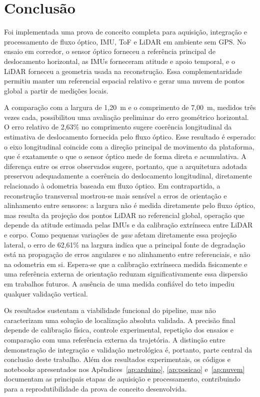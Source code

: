 \section{Conclusão}
\label{sec:conclusao}

Foi implementada uma prova de conceito completa para aquisição, integração e
processamento de fluxo óptico, IMU, ToF e LiDAR em ambiente sem GPS. No ensaio
em corredor, o sensor óptico forneceu a referência principal de deslocamento
horizontal, as IMUs forneceram atitude e apoio temporal, e o LiDAR forneceu a
geometria usada na reconstrução. Essa complementaridade permitiu manter um
referencial espacial relativo e gerar uma nuvem de pontos global a partir de
medições locais.

A comparação com a largura de 1,20~m e o comprimento de 7,00~m, medidos três
vezes cada, possibilitou uma avaliação preliminar do erro geométrico horizontal.
O erro relativo de 2,63\% no comprimento sugere coerência longitudinal da
estimativa de deslocamento fornecida pelo fluxo óptico. Esse resultado é
esperado: o eixo longitudinal coincide com a direção principal de movimento da
plataforma, que é exatamente o que o sensor óptico mede de forma direta e
acumulativa. A diferença entre os erros observados sugere, portanto, que a
arquitetura adotada preservou adequadamente a coerência do deslocamento
longitudinal, diretamente relacionado à odometria baseada em fluxo óptico.
Em contrapartida, a reconstrução transversal mostrou-se mais sensível a erros
de orientação e alinhamento entre sensores: a largura não é medida diretamente
pelo fluxo óptico, mas resulta da projeção dos pontos LiDAR no referencial
global, operação que depende da atitude estimada pelas IMUs e da calibração
extrínseca entre LiDAR e corpo. Como pequenas variações de \textit{yaw}
afetam diretamente essa projeção lateral, o erro de 62,61\% na largura indica
que a principal fonte de degradação está na propagação de erros angulares e no
alinhamento entre referenciais, e não na odometria em si. Espera-se que a
calibração extrínseca medida fisicamente e uma referência externa de orientação
reduzam significativamente essa dispersão em trabalhos futuros. A ausência de
uma medida confiável do teto impediu qualquer validação vertical.

Os resultados sustentam a viabilidade funcional do pipeline, mas não
caracterizam uma solução de localização absoluta validada. A precisão final
depende de calibração física, controle experimental, repetição dos ensaios e
comparação com uma referência externa da trajetória. A distinção entre
demonstração de integração e validação metrológica é, portanto, parte central
da conclusão deste trabalho. Além dos resultados experimentais, os códigos e
notebooks apresentados nos Apêndices~\ref{ap:arduino}, \ref{ap:posicao}
e~\ref{ap:nuvem} documentam as principais etapas de aquisição e processamento,
contribuindo para a reprodutibilidade da prova de conceito desenvolvida.

